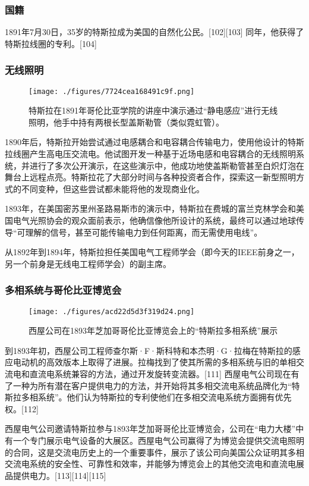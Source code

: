 \subsubsection{国籍} 
1891年7月30日，35岁的特斯拉成为美国的自然化公民。[102][103] 同年，他获得了特斯拉线圈的专利。[104]
\subsubsection{无线照明}
\begin{figure}[ht]
\centering
\texttt{[image: ./figures/7724cea168491c9f.png]}
\caption{特斯拉在1891年哥伦比亚学院的讲座中演示通过“静电感应”进行无线照明，他手中持有两根长型盖斯勒管（类似霓虹管）。} \label{fig_Tesla_9}
\end{figure}
1890年后，特斯拉开始尝试通过电感耦合和电容耦合传输电力，使用他设计的特斯拉线圈产生高电压交流电。他试图开发一种基于近场电感和电容耦合的无线照明系统，并进行了多次公开演示，在这些演示中，他成功地使盖斯勒管甚至白炽灯泡在舞台上远程点亮。特斯拉花了大部分时间与各种投资者合作，探索这一新型照明方式的不同变种，但这些尝试都未能将他的发现商业化。

1893年，在美国密苏里州圣路易斯市的演示中，特斯拉在费城的富兰克林学会和美国电气光照协会的观众面前表示，他确信像他所设计的系统，最终可以通过地球传导“可理解的信号，甚至可能传输电力到任何距离，而无需使用电线”。

从1892年到1894年，特斯拉担任美国电气工程师学会（即今天的IEEE前身之一，另一个前身是无线电工程师学会）的副主席。
\subsubsection{多相系统与哥伦比亚博览会}
\begin{figure}[ht]
\centering
\texttt{[image: ./figures/acd22d5d3f319d24.png]}
\caption{西屋公司在1893年芝加哥哥伦比亚博览会上的“特斯拉多相系统”展示} \label{fig_Tesla_10}
\end{figure}
到1893年初，西屋公司工程师查尔斯·F·斯科特和本杰明·G·拉梅在特斯拉的感应电动机的高效版本上取得了进展。拉梅找到了使其所需的多相系统与旧的单相交流电和直流电系统兼容的方法，通过开发旋转变流器。[111] 西屋电气公司现在有了一种为所有潜在客户提供电力的方法，并开始将其多相交流电系统品牌化为“特斯拉多相系统”。他们认为特斯拉的专利使他们在多相交流电系统方面拥有优先权。[112]

西屋电气公司邀请特斯拉参与1893年芝加哥哥伦比亚博览会，公司在“电力大楼”中有一个专门展示电气设备的大展区。西屋电气公司赢得了为博览会提供交流电照明的合同，这是交流电历史上的一个重要事件，展示了该公司向美国公众证明其多相交流电系统的安全性、可靠性和效率，并能够为博览会上的其他交流电和直流电展品提供电力。[113][114][115]


